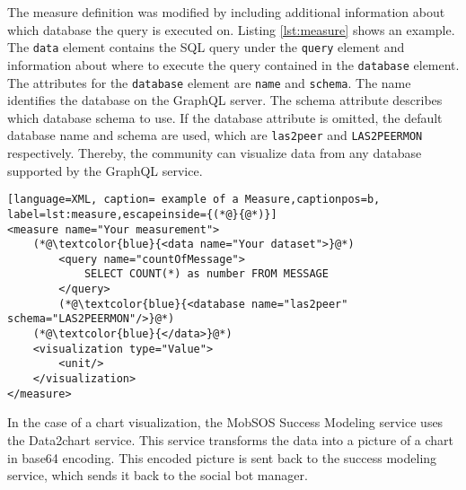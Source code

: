 The measure definition was modified by including additional information about which database the query is executed on. 
Listing \ref{lst:measure} shows an example.
The \texttt{data} element contains the SQL query under the \texttt{query} element and information about where to execute the query contained in the \texttt{database} element.
The attributes for the \texttt{database} element are \texttt{name} and \texttt{schema}. The name identifies the database on the GraphQL server. 
The schema attribute describes which database schema to use.
If the database attribute is omitted, the default database name and schema are used, which are \texttt{las2peer} and \texttt{LAS2PEERMON} respectively.
Thereby, the community can visualize data from any database supported by the GraphQL service.

\begin{lstlisting}[language=XML, caption= example of a Measure,captionpos=b, label=lst:measure,escapeinside={(*@}{@*)}]
<measure name="Your measurement">
    (*@\textcolor{blue}{<data name="Your dataset">}@*)   
        <query name="countOfMessage">
            SELECT COUNT(*) as number FROM MESSAGE
        </query>
        (*@\textcolor{blue}{<database name="las2peer" schema="LAS2PEERMON"/>}@*)
    (*@\textcolor{blue}{</data>}@*)
    <visualization type="Value">
        <unit/>
    </visualization>
</measure>
\end{lstlisting}

In the case of a chart visualization, the MobSOS Success Modeling service uses the Data2chart service. This service transforms the data into a picture of a chart in base64 encoding. This encoded picture is sent back to the success modeling service, which sends it back to the social bot manager.

